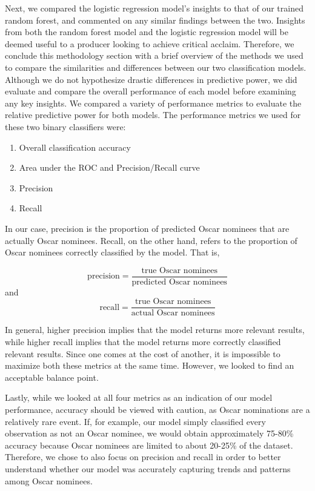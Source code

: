 \documentclass[10pt]{article}
\begin{document}
Next, we compared the logistic regression model’s insights to that of our trained random forest, and commented on any similar findings between the two. Insights from both the random forest model and the logistic regression model will be deemed useful to a producer looking to achieve critical acclaim. Therefore, we conclude this methodology section with a brief overview of the methods we used to compare the similarities and differences between our two classification models. Although we do not hypothesize drastic differences in predictive power, we did evaluate and compare the overall performance of each model before examining any key insights. We compared a variety of performance metrics to evaluate the relative predictive power for both models. The performance metrics we used for these two binary classifiers were:

\begin{enumerate}
\item Overall classification accuracy
\item Area under the ROC and Precision/Recall curve 
\item Precision
\item Recall 
\end{enumerate}

In our case, precision is the proportion of predicted Oscar nominees that are actually Oscar nominees. Recall, on the other hand, refers to the proportion of Oscar nominees correctly classified by the model. That is, 

$$\text{precision} = \frac{\text{true Oscar nominees}}{\text{predicted Oscar nominees}}$$
and 
$$\text{recall} = \frac{\text{true Oscar nominees}}{\text{actual Oscar nominees}}$$

In general, higher precision implies that the model returns more relevant results, while higher recall implies that the model returns more correctly classified relevant results. Since one comes at the cost of another, it is impossible to maximize both these metrics at the same time. However, we looked to find an acceptable balance point. 

Lastly, while we looked at all four metrics as an indication of our model performance, accuracy should be viewed with caution, as Oscar nominations are a relatively rare event. If, for example, our model simply classified every observation as not an Oscar nominee, we would obtain approximately 75-80\% accuracy because Oscar nominees are limited to about 20-25\% of the dataset. Therefore, we chose to also focus on precision and recall in order to better understand whether our model was accurately capturing trends and patterns among Oscar nominees.
\end{document}
